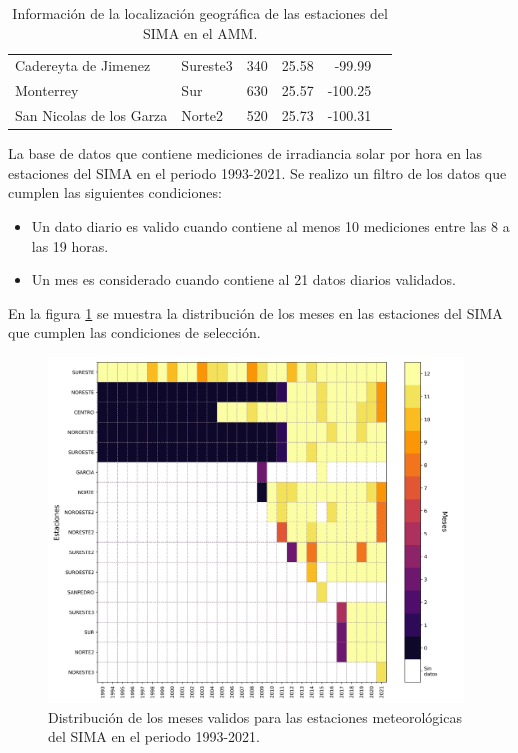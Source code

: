 \begin{table}[H]
\begin{tabular}{llcrrr}
		Cadereyta de Jimenez     & Sureste3        & 340                                                                                       & 25.58                 & -99.99                 \\
		Monterrey                & Sur             & 630                                                                                       & 25.57                 & -100.25                \\
		San Nicolas de los Garza & Norte2          & 520                                                                                       & 25.73                 & -100.31                \\ \hline
	\end{tabular}
	\caption{Información de la localización geográfica de las estaciones del SIMA en el AMM.}
	\label{table:stations_information}
\end{table}
La base de datos que contiene mediciones de irradiancia solar por hora en las estaciones del SIMA en el periodo 1993-2021. Se realizo un filtro de los datos que cumplen las siguientes condiciones:
\begin{itemize}
	\item Un dato diario es valido cuando contiene al menos 10 mediciones entre las 8 a las 19 horas.
	\item Un mes es considerado cuando contiene al 21 datos diarios validados.
\end{itemize}
En la figura \ref{fig:distribution_data} se muestra la distribución de los meses en las estaciones del SIMA que cumplen las condiciones de selección.
\begin{figure}[H]
	\centering
	\includegraphics[width=11cm]{Graphics/Distribution_stations.png}
	\caption{Distribución de los meses validos para las estaciones meteorológicas del SIMA en el periodo 1993-2021.}
	\label{fig:distribution_data}
\end{figure}
